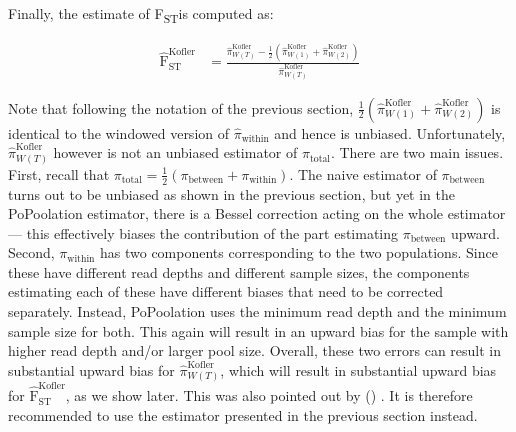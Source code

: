 \documentclass[letterpaper,fontsize=9pt,DIV=12]{scrartcl}
\newcommand\citeay[1]{\citeauthor{#1} (\citeyear{#1}) \cite{#1}}
\newcommand{\fst}{F\textsubscript{ST}}
\begin{document}
Finally, the estimate of \fst is computed as:

\begin{align}
    \label{eq:PoPoolation2FstEst}
    \widehat{\text{F}}_\text{ST}^\text{Kofler} &= \frac{ \widehat{\pi}_{W(T)}^\text{Kofler} - \frac{1}{2} \left(     \widehat{\pi}_{W(1)}^\text{Kofler} +     \widehat{\pi}_{W(2)}^\text{Kofler}  \right)}{ \widehat{\pi}_{W(T)}^\text{Kofler}}
\end{align}

Note that following the notation of the previous section, $\frac{1}{2}\left(\widehat{\pi}_{W(1)}^\text{Kofler} + \widehat{\pi}_{W(2)}^\text{Kofler}\right)$ is identical to the windowed version of $\widehat{\pi}_\text{within}$ and hence is unbiased.  Unfortunately, $\widehat{\pi}_{W(T)}^\text{Kofler}$ however is not an unbiased estimator of $\pi_\text{total}$.  There are two main issues.  First, recall that $\pi_\text{total} = \frac{1}{2}\left(\pi_\text{between}  + \pi_\text{within} \right)$.  The naive estimator of $\pi_\text{between}$ turns out to be unbiased as shown in the previous section, but yet in the PoPoolation estimator, there is a Bessel correction acting on the whole estimator --- this effectively biases the contribution of the part estimating $\pi_\text{between}$ upward.  Second, $\pi_\text{within}$ has two components corresponding to the two populations.  Since these have different read depths and different sample sizes, the components estimating each of these have different biases that need to be corrected separately.  Instead, PoPoolation uses the minimum read depth and the minimum sample size for both.  This again will result in an upward bias for the sample with higher read depth and/or larger pool size.  Overall, these two errors can result in substantial upward bias for $\widehat{\pi}_{W(T)}^\text{Kofler}$, which will result in substantial upward bias for $\widehat{\text{F}}_\text{ST}^\text{Kofler}$, as we show later.  This was also pointed out by \citeay{Hivert2018}. It is therefore recommended to use the estimator presented in the previous section instead.

\end{document}
